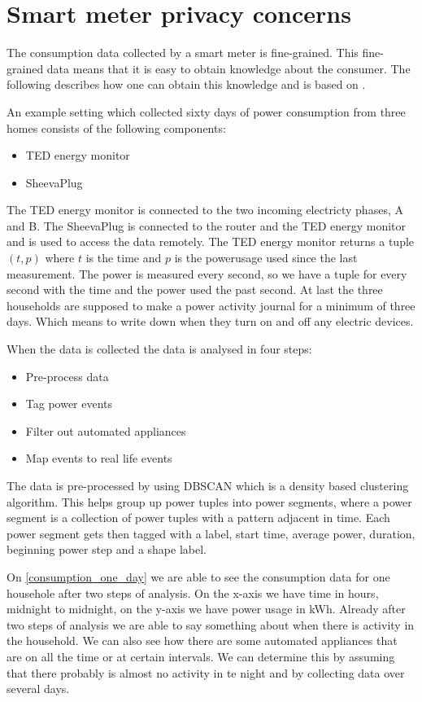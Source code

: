 \section{Smart meter privacy concerns}\label{smart_meter_privacy}
The consumption data collected by a smart meter is fine-grained.
This fine-grained data means that it is easy to obtain knowledge about the consumer.
The following describes how one can obtain this knowledge and is based on \citet{privacy_memoir}.


An example setting which collected sixty days of power consumption from three homes consists of the following components:
\begin{itemize}
\item TED energy monitor
\item SheevaPlug
\end{itemize}
The TED energy monitor is connected to the two incoming electricty phases, A and B.\cite{TED_installation_guide}
The SheevaPlug is connected to the router and the TED energy monitor and is used to access the data remotely.
The TED energy monitor returns a tuple $(t,p)$ where $t$ is the time and $p$ is the powerusage used since the last measurement.
The power is measured every second, so we have a tuple for every second with the time and the power used the past second.
At last the three households are supposed to make a power activity journal for a minimum of three days.
Which means to write down when they turn on and off any electric devices.

When the data is collected the data is analysed in four steps:
\begin{itemize}
\item Pre-process data
\item Tag power events
\item Filter out automated appliances
\item Map events to real life events
\end{itemize}

The data is pre-processed by using DBSCAN which is a density based clustering algorithm.
This helps group up power tuples into power segments, where a power segment is a collection of power tuples with a pattern adjacent in time.
Each power segment gets then tagged with a label, start time, average power, duration, beginning power step and a shape label.


On \cref{consumption_one_day} we are able to see the consumption data for one househole after two steps of analysis.
On the x-axis we have time in hours, midnight to midnight, on the y-axis we have power usage in kWh.
Already after two steps of analysis we are able to say something about when there is activity in the household.
We can also see how there are some automated appliances that are on all the time or at certain intervals.
We can determine this by assuming that there probably is almost no activity in te night and by collecting data over several days.



